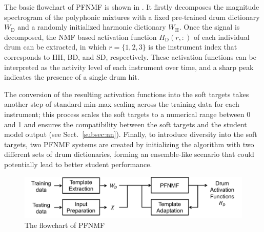 \documentclass{article}
\begin{document}
The basic flowchart of PFNMF is shown in . It firstly decomposes the magnitude spectrogram of the polyphonic mixtures with a fixed pre-trained drum dictionary $W_\mathrm{D}$ and a randomly initialized harmonic dictionary $W_\mathrm{H}$. Once the signal is decomposed, the NMF based activation function $H_\mathrm{D}(r, :)$ of each individual drum can be extracted, in which $r = \{1, 2, 3\}$ is the instrument index that corresponds to HH, BD, and SD, respectively. These activation functions can be interpreted as the activity level of each instrument over time, and a sharp peak indicates the presence of a single drum hit.

The conversion of the resulting activation functions into the soft targets takes another step of standard min-max scaling across the training data for each instrument; this process scales the soft targets to a numerical range between 0 and 1 and ensures the compatibility between the soft targets and the student model output (see Sect.~\ref{subsec:nn}). Finally, to introduce diversity into the soft targets, two PFNMF systems are created by initializing the algorithm with two different sets of drum dictionaries, forming an ensemble-like scenario that could potentially lead to better student performance. %

\begin{figure}
\centering
\includegraphics[width = \columnwidth]{./figs/nmf_flowchart_remake.pdf}
\caption{The flowchart of PFNMF \cite{Wu2015a}}
\label{fig:pfnmf}
\end{figure}
\end{document}
